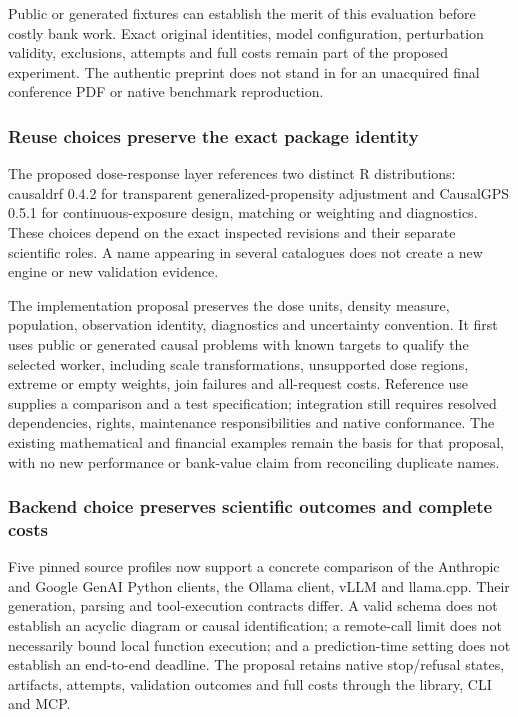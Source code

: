 Public or generated fixtures can establish the merit of this evaluation
before costly bank work. Exact original identities, model configuration,
perturbation validity, exclusions, attempts and full costs remain part
of the proposed experiment. The authentic preprint does not stand in for
an unacquired final conference PDF or native benchmark reproduction.

\hypertarget{reuse-choices-preserve-the-exact-package-identity}{%
\subsubsection{Reuse choices preserve the exact package
identity}\label{reuse-choices-preserve-the-exact-package-identity}}

The proposed dose-response layer references two distinct R
distributions: causaldrf 0.4.2 for transparent generalized-propensity
adjustment and CausalGPS 0.5.1 for continuous-exposure design, matching
or weighting and diagnostics. These choices depend on the exact
inspected revisions and their separate scientific roles. A name
appearing in several catalogues does not create a new engine or new
validation evidence.
\citep{exec24_dose_causaldrf,exec24_dose_causalgps,sp24dosealiases_decisions}

The implementation proposal preserves the dose units, density measure,
population, observation identity, diagnostics and uncertainty
convention. It first uses public or generated causal problems with known
targets to qualify the selected worker, including scale transformations,
unsupported dose regions, extreme or empty weights, join failures and
all-request costs. Reference use supplies a comparison and a test
specification; integration still requires resolved dependencies, rights,
maintenance responsibilities and native conformance. The existing
mathematical and financial examples remain the basis for that proposal,
with no new performance or bank-value claim from reconciling duplicate
names.
\citep{exec24_dose_original,exec24_dose_contract,sp24dosealiases_decisions}

\hypertarget{backend-choice-preserves-scientific-outcomes-and-complete-costs}{%
\subsubsection{Backend choice preserves scientific outcomes and complete
costs}\label{backend-choice-preserves-scientific-outcomes-and-complete-costs}}

Five pinned source profiles now support a concrete comparison of the
Anthropic and Google GenAI Python clients, the Ollama client, vLLM and
llama.cpp. Their generation, parsing and tool-execution contracts
differ. A valid schema does not establish an acyclic diagram or causal
identification; a remote-call limit does not necessarily bound local
function execution; and a prediction-time setting does not establish an
end-to-end deadline. The proposal retains native stop/refusal states,
artifacts, attempts, validation outcomes and full costs through the
library, CLI and MCP.
\citep{exec24_backend_anthropic,exec24_backend_google,exec24_backend_ollama,exec24_backend_vllm,exec24_backend_llamacpp,exec24_backend_reference}

